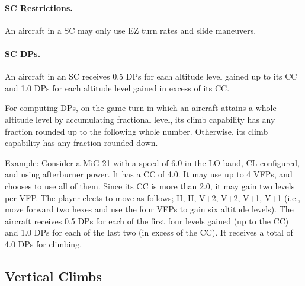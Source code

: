 {\begin{itemize}
\end{itemize}

\paragraph{SC Restrictions.} An aircraft in a SC may only use EZ turn rates and slide maneuvers.

\paragraph{SC DPs.} An aircraft in an SC receives 0.5 DPs for each altitude level gained up to its CC and 1.0 DPs for each altitude level gained in excess of its CC.

For computing DPs, on the game turn in which an aircraft attains a whole altitude level by accumulating fractional level, its climb capability has any fraction rounded up to the following whole number. Otherwise, its climb capability has any fraction rounded down. 

Example: Consider a MiG-21 with a speed of 6.0 in the LO band, CL configured, and using afterburner power. It has a CC of 4.0. It may use up to 4 VFPs, and chooses to use all of them. Since its CC is more than 2.0, it may gain two levels per VFP. The player elects to move as follows; H, H, V+2, V+2, V+1, V+1 (i.e., move forward two hexes and use the four VFPs to gain six altitude levels). The aircraft receives 0.5 DPs for each of the first four levels gained (up to the CC) and 1.0 DPs for each of the last two (in excess of the CC). It receives a total of 4.0 DPs for climbing.
}

\subsection{Vertical Climbs}
\label{rule:vertical-climbs}

